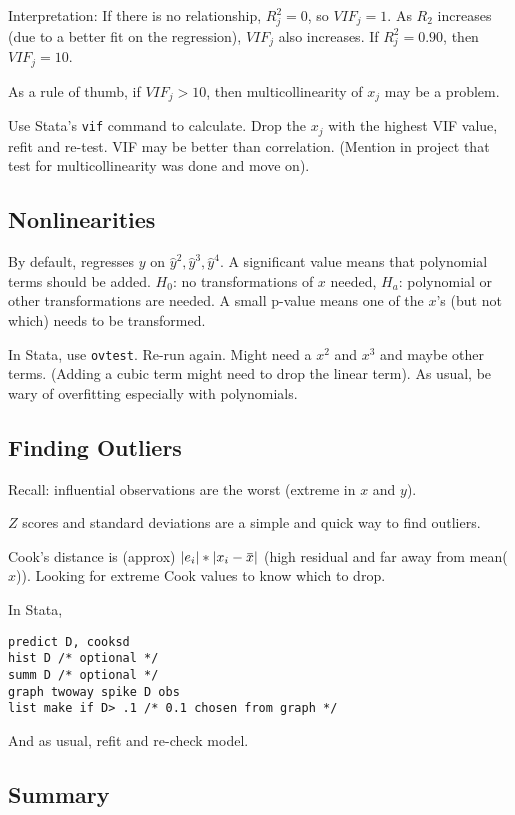 \documentclass[11pt, oneside]{article}   	%
\newcommand{\overbar}[1]{\mkern 1.5mu\overline{\mkern-1.5mu#1\mkern-1.5mu}\mkern 1.5mu}
\begin{document}
Interpretation: If there is no relationship, $R^2_j = 0$, so $VIF_j=1$.  As $R_2$ increases (due to a better fit on the regression), $VIF_j$ also increases. If $R^2_j = 0.90$, then $VIF_j = 10$.  

As a rule of thumb, if $VIF_j > 10$, then multicollinearity of $x_j$ may be a problem.

Use Stata's \texttt{vif} command to calculate. Drop the $x_j$ with the highest VIF value, refit and re-test. VIF may be better than correlation. (Mention in project that test for multicollinearity was done and move on).

\subsection{Nonlinearities}

By default, regresses $y$ on $\hat{y}^2, \hat{y}^3, \hat{y}^4$. A significant value means that polynomial terms should be added. $H_0$: no transformations of $x$ needed, $H_a$: polynomial or other transformations are needed. A small p-value means one of the $x$'s (but not which) needs to be transformed.

In Stata, use \texttt{ovtest}. Re-run again. Might need a $x^2$ and $x^3$ and maybe other terms. (Adding a cubic term might need to drop the linear term). As usual, be wary of overfitting especially with polynomials.

\subsection{Finding Outliers}

Recall: influential observations are the worst (extreme in $x$ and $y$). 

$Z$ scores and standard deviations are a simple and quick way to find outliers.

Cook's distance is (approx) $|e_i| * |x_i - \overbar{x}|$ (high residual and far away from mean($x$)).  Looking for extreme Cook values to know which to drop.

In Stata,
\begin{verbatim}
predict D, cooksd
hist D /* optional */
summ D /* optional */
graph twoway spike D obs
list make if D> .1 /* 0.1 chosen from graph */
\end{verbatim}

And as usual, refit and re-check model.

\subsection{Summary}
\end{document}
